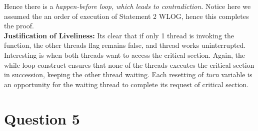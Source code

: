 \documentclass{article}
\newcommand{\bld}[1]{\textbf{#1}}
\newcommand{\ital}[1]{\textit{#1}}
\begin{document}
Hence there is a \ital{happen-before loop, which leads to contradiction}. Notice here we assumed the an order of execution of Statement 2 WLOG, hence this completes the proof.\\

\bld{Justification of Liveliness:} Its clear that if only 1 thread is invoking the function, the other threads flag remains false, and thread works uninterrupted. Interesting is when both threads want to access the critical section. Again, the while loop construct ensures that none of the threads executes the critical section in succession, keeping the other thread waiting. Each resetting of \ital{turn} variable is an opportunity for the waiting thread to complete its request of critical section.



\section*{Question 5}
\end{document}
